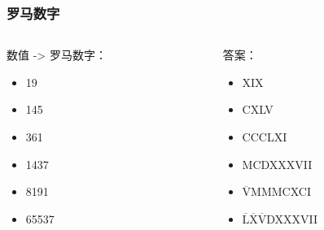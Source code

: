 \begin{frame}\frametitle{罗马数字}
\begin{columns}[c]
\begin{column}{.45\textwidth}
	\begin{exampleblock}{数值 -> 罗马数字：}
		\begin{itemize}
			\item<2-> 19
			\item<4-> 145
			\item<6-> 361
			\item<8-> 1437
			\item<10-> 8191
			\item<12-> 65537
		\end{itemize}
	\end{exampleblock}
\end{column}
\begin{column}{.45\textwidth}
	\begin{alertblock}{答案：}
		\begin{itemize}
			\item<3-> XIX
			\item<5-> CXLV
			\item<7-> CCCLXI
			\item<9-> MCDXXXVII
			\item<11-> $\overline{\text{V}}$MMMCXCI
			\item<13-> $\overline{\text{L}}\overline{\text{X}}\overline{\text{V}}$DXXXVII
		\end{itemize}
	\end{alertblock}
\end{column}
\end{columns}
\end{frame}